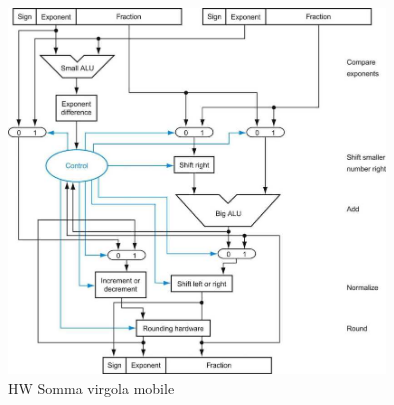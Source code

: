 \begin{figure}[H]
    \centering
    \includegraphics[width=100mm,scale=1.5]{pictures/schema-somma-virgola-mobile.png}
    \caption{HW Somma virgola mobile}
    \label{fig:hw-floating-point-addition}
\end{figure}